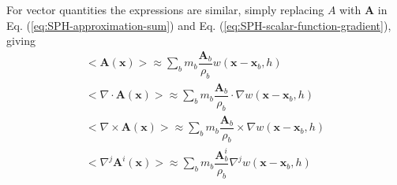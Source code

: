 \documentclass[gmd, manuscript]{copernicus} %
\begin{document}
For vector quantities the expressions are similar, simply replacing $A$ with $\textbf{A}$ in Eq. (\ref{eq:SPH-approximation-sum}) and Eq. (\ref{eq:SPH-scalar-function-gradient}), giving
\begin{align}
<\textbf{A}\left(\textbf{x}\right)> \approx \sum_b m_b \dfrac{\textbf{A}_b}{\rho_b} w\left(\textbf{x}-\textbf{x}_b, h\right) \\
<\nabla \cdot \textbf{A}\left(\textbf{x}\right)> \approx \sum_b m_b \dfrac{\textbf{A}_b}{\rho_b} \cdot \nabla w\left(\textbf{x} - \textbf{x}_b, h\right) \\
<\nabla \times \textbf{A}\left(\textbf{x}\right)> \approx \sum_b m_b \dfrac{\textbf{A}_b}{\rho_b} \times \nabla w\left(\textbf{x} - \textbf{x}_b, h\right) \\
<\nabla^j \textbf{A}^i\left(\textbf{x}\right)> \approx \sum_b m_b \dfrac{\textbf{A}_b^i}{\rho_b} \nabla^j w\left(\textbf{x} - \textbf{x}_b, h\right) 
\label{eq:SPH-vecctor-function}
\end{align}
\end{document}
